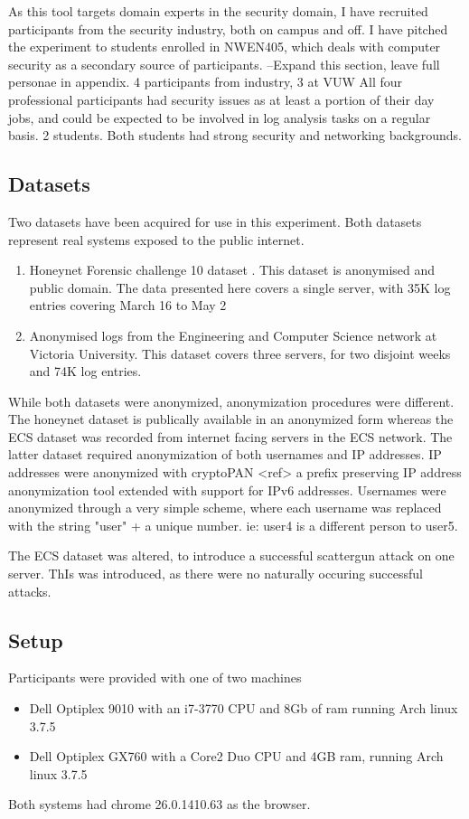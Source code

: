 As this tool targets domain experts in the security domain, I have recruited participants from the security industry, both on campus and off. I have pitched the experiment to students enrolled in NWEN405, which deals with computer security as a secondary source of participants.
--Expand this section, leave full personae in appendix.
4 participants from industry, 3 at VUW
All four professional participants had security issues as at least a portion of their day jobs, and could be expected to be involved in log analysis tasks on a regular basis.
2 students.  Both students had strong security and networking backgrounds.

\subsection{Datasets}\label{data}

Two datasets have been acquired for use in this experiment. Both datasets represent real systems exposed to the public internet. 
\begin{enumerate}
\item{Honeynet Forensic challenge 10 dataset \cite{forensic10}. This dataset is anonymised and public domain. The data presented here covers a single server, with 35K log entries covering March 16 to May 2}
\item{Anonymised logs from the Engineering and Computer Science network at Victoria University. This dataset covers three servers, for two disjoint weeks and 74K log entries.}
\end{enumerate}

While both datasets were anonymized, anonymization procedures were different. The honeynet dataset is publically available in an anonymized form \cite{forensic10} whereas the ECS dataset was recorded from internet facing servers in the ECS network. The latter dataset required anonymization of both usernames and IP addresses. IP addresses were anonymized with cryptoPAN <ref> a prefix preserving IP address anonymization tool extended with support for IPv6 addresses. Usernames were anonymized through a very simple scheme, where each username was replaced with the string "user" + a unique number. ie: user4 is a different person to user5.

The ECS dataset was altered, to introduce a successful scattergun attack on one server. ThIs was introduced, as there were no naturally occuring successful attacks.  

\subsection{Setup}
Participants were provided with one of two machines
\begin{itemize}
\item{Dell Optiplex 9010 with an i7-3770 CPU and 8Gb of ram running Arch linux 3.7.5}
\item{Dell Optiplex GX760 with a Core2 Duo CPU and 4GB ram, running Arch linux 3.7.5}
\end{itemize}
Both systems had chrome 26.0.1410.63 as the browser.

